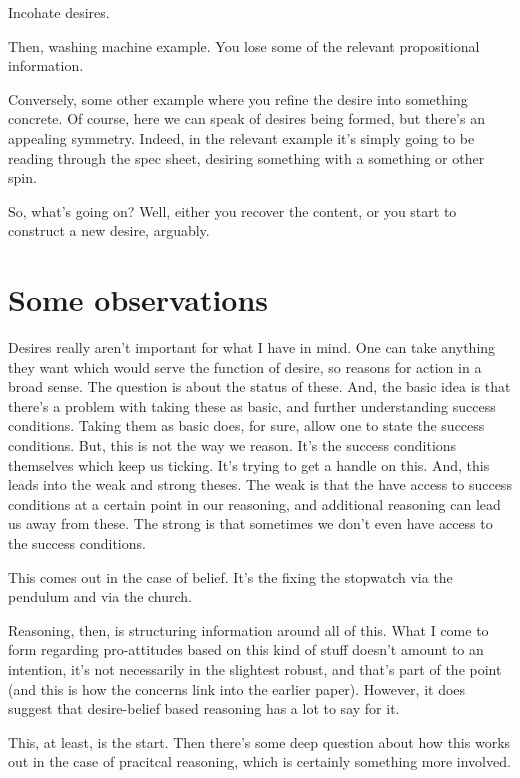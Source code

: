 \documentclass[10pt]{article}
\begin{document}
Incohate desires.

Then, washing machine example.
You lose some of the relevant propositional information.

Conversely, some other example where you refine the desire into something concrete.
Of course, here we can speak of desires being formed, but there's an appealing symmetry.
Indeed, in the relevant example it's simply going to be reading through the spec sheet, desiring something with a something or other spin.


So, what's going on?
Well, either you recover the content, or you start to construct a new desire, arguably.


\section{Some observations}
\label{sec:some-observations}

Desires really aren't important for what I have in mind.
One can take anything they want which would serve the function of desire, so reasons for action in a broad sense.
The question is about the status of these.
And, the basic idea is that there's a problem with taking these as basic, and further understanding success conditions.
Taking them as basic does, for sure, allow one to state the success conditions.
But, this is not the way we reason.
It's the success conditions themselves which keep us ticking.
It's trying to get a handle on this.
And, this leads into the weak and strong theses.
The weak is that the have access to success conditions at a certain point in our reasoning, and additional reasoning can lead us away from these.
The strong is that sometimes we don't even have access to the success conditions.

This comes out in the case of belief.
It's the fixing the stopwatch via the pendulum and via the church.

Reasoning, then, is structuring information around all of this.
What I come to form regarding pro-attitudes based on this kind of stuff doesn't amount to an intention, it's not necessarily in the slightest robust, and that's part of the point (and this is how the concerns link into the earlier paper).
However, it does suggest that desire-belief based reasoning has a lot to say for it.

This, at least, is the start.
Then there's some deep question about how this works out in the case of pracitcal reasoning, which is certainly something more involved.
\end{document}
